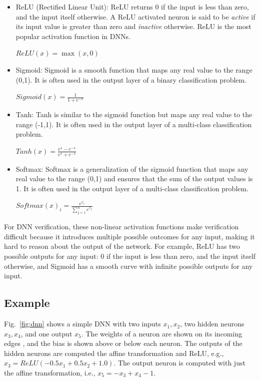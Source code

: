 \documentclass[oneside,11pt,dvipsnames]{book}
\begin{document}
\begin{itemize}
\item ReLU (Rectified Linear Unit):  ReLU returns 0 if the input is less than zero, and the input itself otherwise. 
A ReLU activated neuron is said to be \emph{active} if its input value is greater than zero and \emph{inactive} otherwise.
ReLU is the most popular activation function in DNNs.\\
    \begin{center}
        $ReLU(x) = \max(x,0)$
    \end{center}


    
    
\item Sigmoid: Sigmoid is a smooth function that maps any real value to the range (0,1). It is often used in the output layer of a binary classification problem.\\
    \begin{center}
        $Sigmoid(x) = \frac{1}{1+e^{-x}}$
    \end{center}
\item Tanh: Tanh is similar to the sigmoid function but maps any real value to the range (-1,1). It is often used in the output layer of a multi-class classification problem.\\
    \begin{center}
        $Tanh(x) = \frac{e^x-e^{-x}}{e^x+e^{-x}}$
    \end{center}
\item Softmax: Softmax is a generalization of the sigmoid function that maps any real value to the range (0,1) and ensures that the sum of the output values is 1. It is often used in the output layer of a multi-class classification problem.\\
    \begin{center}
    $Softmax(x)_i = \frac{e^{x_i}}{\sum_{j=1}^{n}e^{x_j}}$
    \end{center}
\end{itemize}

For DNN verification, these non-linear activation functions make verification difficult because it introduces multiple possible outcomes for any input, making it hard to reason about the output of the network. For example, ReLU has two possible outputs for any input: 0 if the input is less than zero, and the input itself otherwise, and Sigmoid has a smooth curve with infinite possible outputs for any input.


\subsection{Example} 
Fig.~\ref{fig:dnn} shows a simple DNN with two inputs $x_1,x_2$, two hidden neurons $x_3,x_4$, and one output $x_5$. The weights of a neuron are shown on its incoming edges , and the bias is shown above or below each neuron. The outputs of the hidden neurons  are computed the affine transformation and ReLU, e.g., $x_3 = ReLU(-0.5x_1+0.5x_2+1.0)$. The output neuron is computed with just the affine transformation, i.e., $x_5=-x_3+x_4-1$.
\end{document}
